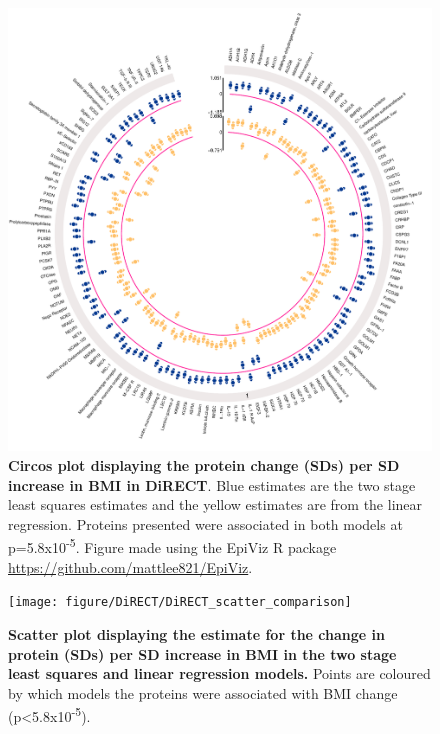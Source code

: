 \documentclass[11pt,twoside]{bristolthesis}
\newcommand{\blandscape}{\begin{landscape}}
\newcommand{\elandscape}{\end{landscape}}
\begin{document}
\begin{figure}
\includegraphics[width=1\linewidth]{figure/DiRECT/circos_plot_BMI_change_protein_ols_tsls} \caption[Circos plot of proteins associated with BMI change in DiRECT]{\textbf{Circos plot displaying the protein change (SDs) per SD increase in BMI in DiRECT}. Blue estimates are the two stage least squares estimates and the yellow estimates are from the linear regression. Proteins presented were associated in both models at p=5.8x10\textsuperscript{-5}. Figure made using the EpiViz R package \url{https://github.com/mattlee821/EpiViz}.}\label{fig:circos}
\end{figure}
\blandscape



\begin{figure}
\texttt{[image: figure/DiRECT/DiRECT\_scatter\_comparison]} \caption[Scatter plot comparing proteins association with BMI change across models in DiRECT]{\textbf{Scatter plot displaying the estimate for the change in protein (SDs) per SD increase in BMI in the two stage least squares and linear regression models.} Points are coloured by which models the proteins were associated with BMI change (p\textless5.8x10\textsuperscript{-5}).}\label{fig:scatter-DiRECT}
\end{figure}
\elandscape
\end{document}
